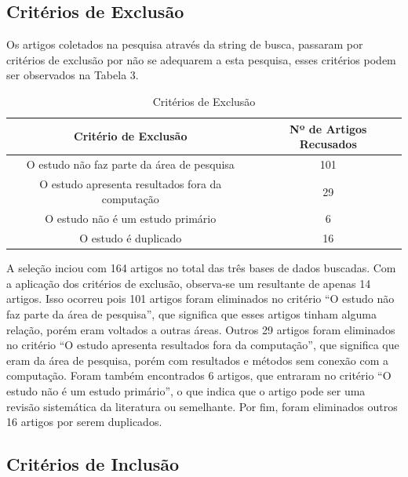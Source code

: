 \subsection{Critérios de Exclusão}

Os artigos coletados na pesquisa através da string de busca, passaram por critérios de exclusão por não se adequarem a esta pesquisa, esses critérios podem ser observados na Tabela 3. 

\begin{table}[!htb]
	\centering
	\caption{Critérios de Exclusão}
	\label{tbl:exclusao}
	\begin{tabular}{|c|c|}
		\hline
		\textbf{Critério de Exclusão}                    & \textbf{Nº de Artigos Recusados} \\ \hline
		O estudo não faz parte da área de pesquisa       & 101                               \\ \hline
		O estudo apresenta resultados fora da computação & 29                                \\ \hline
		O estudo não é um estudo primário               & 6                                 \\ \hline
		O estudo é duplicado                              & 16                                \\ \hline
	\end{tabular}
	\vspace{6pt}
\end{table}

A seleção inciou com 164 artigos no total das três bases de dados buscadas. Com a aplicação dos critérios de exclusão, observa-se um resultante de apenas 14 artigos. Isso ocorreu pois 101 artigos foram eliminados no critério ``O estudo não faz parte da área de pesquisa'', que significa que esses artigos tinham alguma relação, porém eram voltados a outras áreas. Outros 29 artigos foram eliminados no critério ``O estudo apresenta resultados fora da computação'', que significa que eram da área de pesquisa, porém com resultados e métodos sem conexão com a computação. Foram também encontrados 6 artigos, que entraram no critério ``O estudo não é um estudo primário'', o que indica que o artigo pode ser uma revisão sistemática da literatura ou semelhante. Por fim, foram eliminados outros 16 artigos por serem duplicados.

\subsection{Critérios de Inclusão}

